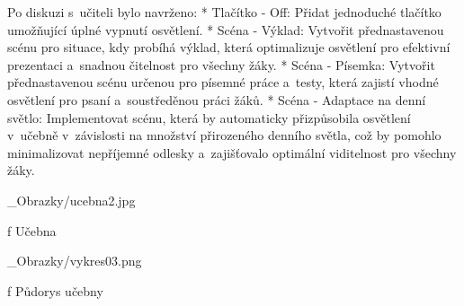 \medskip\noindent
Po diskuzi s~učiteli bylo navrženo:
\begitems
    * {\sbf Tlačítko - Off:} Přidat jednoduché tlačítko umožňující úplné vypnutí osvětlení.
    * {\sbf Scéna - Výklad:} Vytvořit přednastavenou scénu pro situace, kdy probíhá výklad, která optimalizuje
        osvětlení pro efektivní prezentaci a~snadnou čitelnost pro všechny žáky.
    * {\sbf Scéna - Písemka:} Vytvořit přednastavenou scénu určenou pro písemné práce a~testy, která
        zajistí vhodné osvětlení pro psaní a~soustředěnou práci žáků.
    * {\sbf Scéna - Adaptace na denní světlo:} Implementovat scénu, která by automaticky přizpůsobila
        osvětlení v~učebně v~závislosti na množství přirozeného denního světla, což by pomohlo minimalizovat
        nepříjemné odlesky a~zajišťovalo optimální viditelnost pro všechny žáky.
\enditems

\medskip {}
\picw=8cm _Obrazky/ucebna2.jpg
\caption/f Učebna
\medskip

\medskip {}
\picw=20cm _Obrazky/vykres03.png
\caption/f Půdorys učebny
\medskip






